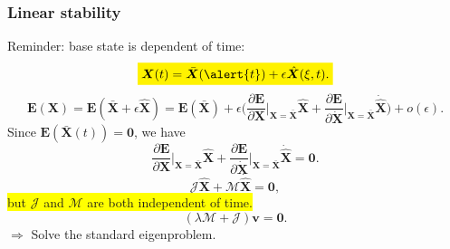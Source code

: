 \documentclass{beamer}
\begin{document}
\begin{frame}
	\frametitle{Linear stability}
	\begin{overlayarea}{\textwidth}{\textheight}\vspace{-0.3cm}
			Reminder: base state is dependent of time:
			\begin{equation*}
			\colorbox{yellow}{$\bm{X}(t)=\bar{\bm{X}}(\alert{t})+\epsilon \hat{\bm{X}}(\xi,t)$.}
		\end{equation*}
		\begin{equation*}
			\bm{E}(\bm{X})=\bm{E}(\bar{\bm{X}}+\epsilon \hat{\bm{X}})=\bm{E}(\bar{\bm{X}})+\epsilon \Big(\frac{\partial \bm{E}}{\partial \bm{X}}\Big|_{\bm{X}=\bar{\bm{X}}}\hat{\bm{X}}+\frac{\partial \bm{E}}{\partial \dot{\bm{X}}}\Big|_{\bm{X}=\bar{\bm{X}}}\dot{\hat{\bm{X}}}\Big)+o(\epsilon).
		\end{equation*}
		Since $\bm{E}(\bar{\bm{X}}(t))=\bm{0}$, we have 
		\begin{equation*}
			\frac{\partial \bm{E}}{\partial \bm{X}}\Big|_{\bm{X}=\bar{\bm{X}}}\hat{\bm{X}}+\frac{\partial \bm{E}}{\partial \dot{\bm{X}}}\Big|_{\bm{X}=\bar{\bm{X}}}\dot{\hat{\bm{X}}}=\bm{0}.
		\end{equation*}
		\begin{equation*}
			\bm{\mathcal{J}}\hat{\bm{X}}+\bm{\mathcal{M}}\dot{\hat{\bm{X}}}=\bm{0},
		\end{equation*}
		\colorbox{yellow}{but $\bm{\mathcal{J}}$ and $\bm{\mathcal{M}}$ are both independent of time.}
		\begin{equation*}
			(\lambda\bm{\mathcal{M}}+\bm{\mathcal{J}})\bm{v}=\bm{0}.
		\end{equation*}
	$\Rightarrow$ Solve the standard eigenproblem. 
	\end{overlayarea}
\end{frame}

\end{document}

